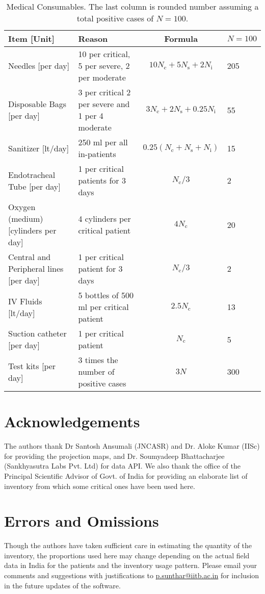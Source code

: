 \documentclass{article}
\newcommand{\email}[1]{\href{mailto:#1}{#1}}
\newcommand{\nc}{\ensuremath{N_{\mathrm{c}}}}
\newcommand{\ns}{\ensuremath{N_{\mathrm{s}}}}
\newcommand{\nin}{\ensuremath{N_{\mathrm{i}}}}
\begin{document}
\begin{landscape}
\begin{table}
  \caption{Medical Consumables. The last column is
    rounded number assuming a total positive cases of $N=100$.}
  \begin{tabularx}{\linewidth}{XXcl}
    \toprule
    Item [Unit] & Reason & Formula & $N=100$ \\
    \midrule
Needles [per day]& 10 per critical, 5 per severe, 2 per moderate&
$10 \nc + 5 \ns + 2 \nin$ & 205 \\
Disposable Bags [per day] & 3 per critical 2 per severe and 1 per 4
moderate & $ 3\nc + 2\ns + 0.25\nin$ & 55 \\
Sanitizer [lt/day] & 250 ml per all in-patients & $0.25 (\nc+\ns+\nin)$
& 15 \\
Endotracheal Tube [per day] & 1 per critical patients for 3 days &
$\nc/3$ & 2 \\
Oxygen (medium) [cylinders per day] & 4 cylinders per critical patient
& $4 \nc$  & 20 \\ 
Central and Peripheral lines [per day] & 1 per critical patient for 3
days & $\nc/3$ & 2 \\
IV Fluids [lt/day] & 5 bottles of 500 ml per critical patient &
$2.5 \nc$ & 13 \\
Suction catheter [per day] & 1 per critical patient & $\nc$ & 5 \\
Test kits [per day] & 3 times the number of positive cases &
$3 N$ & 300  \\
\bottomrule
\end{tabularx}
\end{table}
\end{landscape}

\section{Acknowledgements}
The authors thank Dr Santosh Ansumali (JNCASR) and Dr. Aloke Kumar
(IISc) for providing the projection maps, and Dr. Soumyadeep
Bhattacharjee (Sankhyasutra Labs Pvt. Ltd) for data API. We also thank
the office of the Principal Scientific Advisor of Govt. of India for
providing an elaborate list of inventory from which some critical ones
have been used here.

\section{Errors and Omissions}
Though the authors have taken sufficient care in estimating the
quantity of the inventory, the proportions used here may change
depending on the actual field data in India for the patients and the
inventory usage pattern.  Please email your comments and suggestions
with justifications to \email{p.sunthar@iitb.ac.in} for inclusion in the
future updates of the software.




\end{document}
